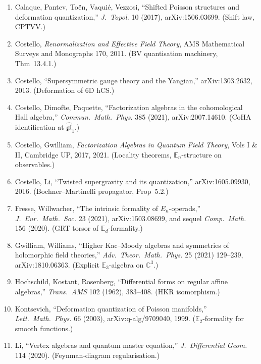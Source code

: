 \documentclass[11pt]{article}
\theoremstyle{definition}
\providecommand{\CC}{\mathbb{C}}
\begin{document}
\begin{enumerate}[leftmargin=2em]
  \item Calaque, Pantev, To\"en, Vaqui\'e, Vezzosi, ``Shifted Poisson
        structures and deformation quantization,''
        \emph{J.~Topol.} 10 (2017), arXiv:1506.03699. (Shift law,
        CPTVV.)
  \item Costello, \emph{Renormalization and Effective Field Theory},
        AMS Mathematical Surveys and Monographs 170, 2011. (BV
        quantisation machinery, Thm~13.4.1.)
  \item Costello, ``Supersymmetric gauge theory and the Yangian,''
        arXiv:1303.2632, 2013. (Deformation of 6D hCS.)
  \item Costello, Dimofte, Paquette, ``Factorization algebras in the
        cohomological Hall algebra,'' \emph{Commun.~Math.~Phys.} 385
        (2021), arXiv:2007.14610. (CoHA identification at
        $\widehat{\mathfrak{gl}}_1$.)
  \item Costello, Gwilliam, \emph{Factorization Algebras in Quantum
        Field Theory}, Vols I \& II, Cambridge UP, 2017, 2021.
        (Locality theorems, $\mathbb{E}_n$-structure on observables.)
  \item Costello, Li, ``Twisted supergravity and its quantization,''
        arXiv:1605.09930, 2016. (Bochner--Martinelli propagator,
        Prop~5.2.)
  \item Fresse, Willwacher, ``The intrinsic formality of
        $E_n$-operads,''
        \emph{J.~Eur.~Math.~Soc.} 23 (2021), arXiv:1503.08699, and
        sequel \emph{Comp.~Math.} 156 (2020). (GRT torsor of
        $\mathbb{E}_d$-formality.)
  \item Gwilliam, Williams, ``Higher Kac--Moody algebras and
        symmetries of holomorphic field theories,''
        \emph{Adv.~Theor.~Math.~Phys.} 25 (2021) 129--239,
        arXiv:1810.06363. (Explicit $\mathbb{E}_3$-algebra on
        $\CC^3$.)
  \item Hochschild, Kostant, Rosenberg, ``Differential forms on
        regular affine algebras,''
        \emph{Trans.~AMS} 102 (1962), 383--408. (HKR isomorphism.)
  \item Kontsevich, ``Deformation quantization of Poisson manifolds,''
        \emph{Lett.~Math.~Phys.} 66 (2003), arXiv:q-alg/9709040,
        1999. ($\mathbb{E}_2$-formality for smooth functions.)
  \item Li, ``Vertex algebras and quantum master equation,''
        \emph{J.~Differential Geom.} 114 (2020). (Feynman-diagram
        regularisation.)

\end{enumerate}
\end{document}

